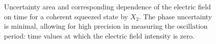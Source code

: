 \begin{figure}
\centering



\caption{Uncertainty area and corresponding dependence of the electric field on time for a coherent squeezed state by $X_2$. The phase uncertainty is minimal, allowing for high precision in measuring the oscillation period: time values at which the electric field intensity is zero.}
\label{figPart3Squeezed_3}
\end{figure}